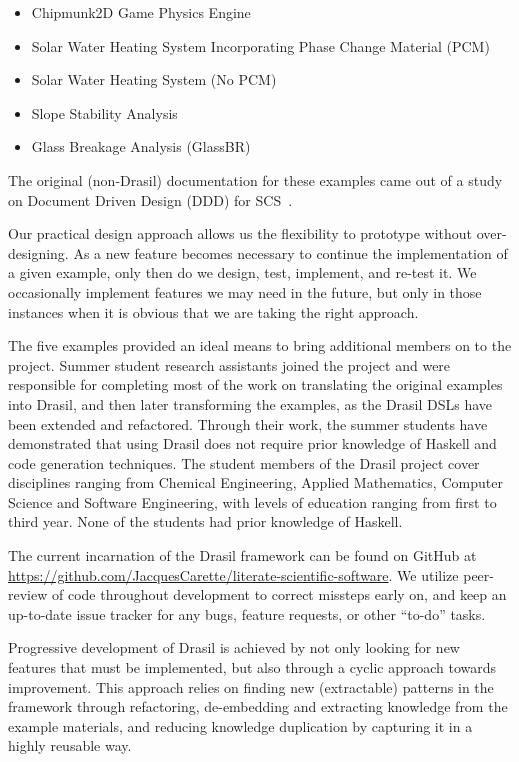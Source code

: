\documentclass[sigconf]{acmart}
\begin{document}
\begin{itemize}
\item Chipmunk2D Game Physics Engine
\item Solar Water Heating System Incorporating Phase Change Material (PCM)
\item Solar Water Heating System (No PCM)
\item Slope Stability Analysis
\item Glass Breakage Analysis (GlassBR)
\end{itemize}
The original (non-Drasil) documentation for these examples came out of a study
on Document Driven Design (DDD) for SCS~\cite{SmithJegatheesanAndKelly2016}.

Our practical design approach allows us the flexibility to prototype without 
over-designing. As a new feature becomes necessary to continue the 
implementation of a given example, only then do we design, test, implement, and 
re-test it. We occasionally implement features we may need in the future, but 
only in those instances when it is obvious that we are taking the right 
approach.

The five examples provided an ideal means to bring additional members on to the
project.  Summer student research assistants joined the project and were
responsible for completing most of the work on translating the original examples
into Drasil, and then later transforming the examples, as the Drasil DSLs have
been extended and refactored.  Through their work, the summer students have
demonstrated that using Drasil does not require prior knowledge of Haskell and
code generation techniques.  The student members of the Drasil project cover
disciplines ranging from Chemical Engineering, Applied Mathematics, Computer
Science and Software Engineering, with levels of education ranging from first to
third year. None of the students had prior knowledge of Haskell.

The current incarnation of the Drasil framework can be found on GitHub at 
\href{https://github.com/JacquesCarette/literate-scientific-software}
{https://github.com/JacquesCarette/literate-scientific-software}. We utilize 
peer-review of code throughout development to correct missteps early on, and 
keep an up-to-date issue tracker for any bugs, feature requests, or other 
``to-do'' tasks.

Progressive development of Drasil is achieved by not only looking for new 
features that must be implemented, but also through a cyclic approach towards 
improvement. This approach relies on finding new (extractable) patterns in the 
framework through refactoring, de-embedding and extracting knowledge from the 
example materials, and reducing knowledge duplication by capturing it in a 
highly reusable way.
\end{document}
